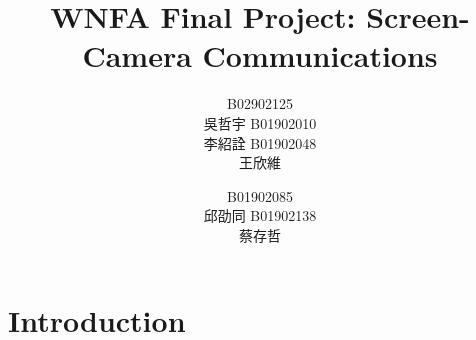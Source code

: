 \documentclass{acm_proc_article-sp}
\begin{document}
\title{WNFA Final Project: Screen-Camera Communications}
\subtitle{}
\author{
\alignauthor B02902125\\吳哲宇
\alignauthor B01902010\\李紹詮
\alignauthor B01902048\\王欣維
\and
\alignauthor B01902085\\邱劭同
\alignauthor B01902138\\蔡存哲
}

\maketitle

\begin{abstract}
\end{abstract}

\section{Introduction}
\end{document}
